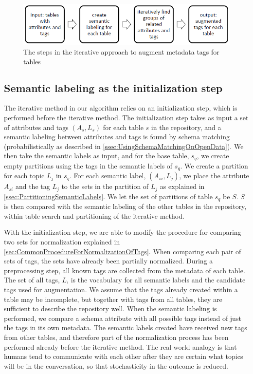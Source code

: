 \begin{figure}
    \centering
    \includegraphics[width=5in]{figures/the-steps-iterative-approach.png}
    \caption{The steps in the iterative approach to augment metadata tags for tables}
    \label{fig:the-steps-iterative-approach}
\end{figure}

\subsection{Semantic labeling as the initialization step}
\label{ssec:SemanticLabelingAsTheInitializationStep}

The iterative method in our algorithm relies on an initialization step, which is performed before the iterative method. The initialization step takes as input a set of attributes and tags $(A_{s},L_{s})$ for each table $s$ in the repository, and a semantic labeling between attributes and tags is found by schema matching (probabilistically as described in \autoref{ssec:UsingSchemaMatchingOnOpenData}). We then take the semantic labels as input, and for the base table, $s_q$, we create empty partitions using the tags in the semantic labels of $s_q$. We create a partition for each topic $L_{j}$ in $s_q$. For each semantic label, $(A_{si},L_{j})$, we place the attribute $A_{si}$ and the tag $L_{j}$ to the sets in the partition of $L_{j}$ as explained in \autoref{ssec:PartitioningSemanticLabels}. We let the set of partitions of table $s_q$ be $S$. $S$ is then compared with the semantic labeling of the other tables in the repository, within table search and partitioning of the iterative method.

With the initialization step, we are able to modify the procedure for comparing two sets for normalization explained in \autoref{sec:CommonProcedureForNormalizationOfTags}. When comparing each pair of sets of tags, the sets have already been  partially normalized. During a preprocessing step, all known tags are collected from the metadata of each table. The set of all tags, $L$, is the vocabulary for all semantic labels and the candidate tags used for augmentation. We assume that the tags already created within a table may be incomplete, but together with tags from all tables, they are sufficient to describe the repository well. When the semantic labeling is performed, we compare a schema attribute with all possible tags instead of just the tags in its own metadata. The semantic labels created have received new tags from other tables, and therefore part of the normalization process has been performed already before the iterative method. The real world analogy is that humans tend to communicate with each other after they are certain what topics will be in the conversation, so that stochasticity in the outcome is reduced.

